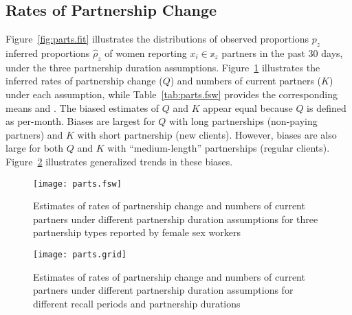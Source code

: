 \subsection{Rates of Partnership Change}\label{res.parts}
Figure~\ref{fig:parts.fit} illustrates the distributions of
observed proportions $p_z$ \vs inferred proportions $\hat{\rho}_z$ of women
reporting $x_i \in \mathbb{x}_z$ partners in the past 30 days,
under the three partnership duration assumptions.
Figure~\ref{fig:parts.fsw} illustrates the inferred
rates of partnership change ($Q$) and numbers of current partners ($K$) under each assumption,
while Table~\ref{tab:parts.fsw} provides the corresponding means and \ci.
The biased estimates of $Q$ and $K$ appear equal because $Q$ is defined as per-month.
Biases are largest for
$Q$ with long partnerships (\eg non-paying partners) and
$K$ with short partnership (\eg new clients).
However, biases are also large for
both $Q$ and $K$ with ``medium-length'' partnerships (\eg regular clients).
Figure~\ref{fig:parts.grid} illustrates generalized trends in these biases.
\begin{figure}
  \centering\texttt{[image: parts.fsw]}
  \caption{Estimates of rates of partnership change and numbers of current partners
    under different partnership duration assumptions
    for three partnership types reported by female sex workers}
  \label{fig:parts.fsw}
\end{figure}
\begin{figure}
  \centering\texttt{[image: parts.grid]}
  \caption{Estimates of rates of partnership change and numbers of current partners
    under different partnership duration assumptions
    for different recall periods and partnership durations}
  \label{fig:parts.grid}
\end{figure}
